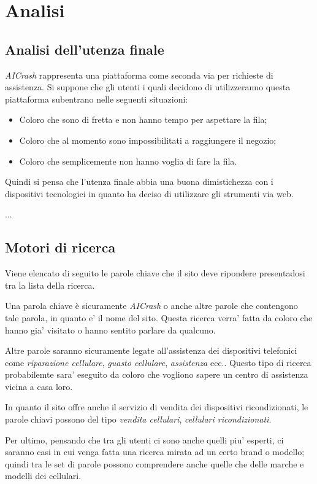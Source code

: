 \section{Analisi}

\subsection{Analisi dell'utenza finale}
\textit{AICrash} rappresenta una piattaforma come seconda via per richieste di assistenza.
Si suppone che gli utenti i quali decidono di utilizzeranno questa piattaforma subentrano nelle seguenti situazioni:
\begin{itemize}
	\item Coloro che sono di fretta e non hanno tempo per aspettare la fila;
	\item Coloro che al momento sono impossibilitati a raggiungere il negozio;
	\item Coloro che semplicemente non hanno voglia di fare la fila.
\end{itemize}

Quindi si pensa che  l'utenza finale abbia una buona dimistichezza con i dispositivi tecnologici
in quanto ha deciso di utilizzare gli strumenti via web.

...

\subsection{Motori di ricerca}
Viene elencato di seguito le parole chiave che il sito deve ripondere presentadosi
tra la lista della ricerca.

Una parola chiave è sicuramente \textit{AICrash} o anche altre parole che contengono tale parola, in quanto
e' il nome del sito. Questa ricerca verra' fatta da coloro che hanno gia' visitato o hanno sentito parlare da qualcuno.

Altre parole saranno sicuramente legate all'assistenza dei dispositivi telefonici come \textit{riparazione cellulare}, \textit{guasto cellulare},
\textit{assistenza} ecc..
Questo tipo di ricerca probabilemte sara' eseguito da coloro che vogliono sapere un centro di assistenza vicina a casa loro.

In quanto il sito offre anche il servizio di vendita dei dispositivi ricondizionati, le parole chiavi possono del tipo
\textit{vendita cellulari}, \textit{cellulari ricondizionati}.

Per ultimo, pensando che tra gli utenti ci sono anche quelli piu' esperti, ci saranno casi in cui
venga fatta una ricerca mirata ad un certo brand o modello; quindi tra le set di parole possono comprendere
anche quelle che delle marche e modelli dei cellulari.

